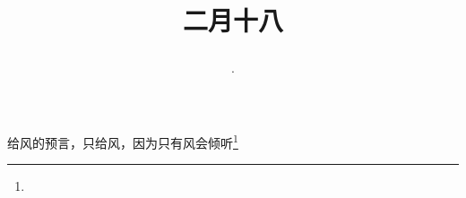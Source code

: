 \title{\date[d=27,m=3,y=2024][year:cn-y,年,month:cn,day:cn,日,·,weekday]·二月十八 }
给风的预言，只给风，因为只有风会倾听\footnote{ }

